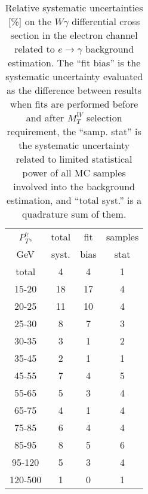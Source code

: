 \begin{table}[h]
  \scriptsize
  \begin{center}
  \caption{Relative systematic uncertainties [\%] on the $W\gamma$ differential cross section in the electron channel related to $e\rightarrow\gamma$ background estimation. The ``fit bias'' is the systematic uncertainty evaluated as the difference between results when fits are performed before and after $M_T^{W}$ selection requirement, the ``samp. stat'' is the systematic uncertainty related to limited statistical power of all MC samples involved into the background estimation, and ``total syst.'' is a quadrature sum of them. }
  \begin{tabular}{|c|c|c|c|}
    \hline
    $P_T^{\gamma}$,  & total & fit  & samples\\
    GeV  & syst. & bias & stat\\ \hline
    total  & 4 & 4 & 1 \\ \hline
    15-20 & 18 & 17 & 4 \\ \hline
    20-25 & 11 & 10 & 4 \\ \hline
    25-30 & 8 & 7 & 3 \\ \hline
    30-35 & 3 & 1 & 2 \\ \hline
    35-45 & 2 & 1 & 1 \\ \hline
    45-55 & 7 & 4 & 5 \\ \hline
    55-65 & 5 & 3 & 4 \\ \hline
    65-75 & 4 & 1 & 4 \\ \hline
    75-85 & 6 & 4 & 4 \\ \hline
    85-95 & 8 & 5 & 6 \\ \hline
    95-120 & 5 & 3 & 4 \\ \hline
    120-500 & 1 & 0 & 1 \\ \hline
  \end{tabular}
  \label{tab:systInPercentEtogamma_ELECTRON_WGamma}
  \end{center}
\end{table}

